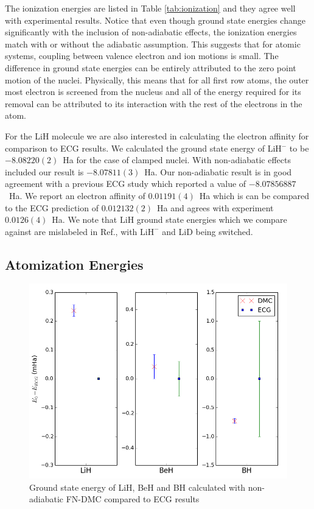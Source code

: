 \documentclass[pra,superscriptaddress,groupedaddress,twocolumn]{revtex4}
\begin{document}
The ionization energies are listed in Table \ref{tab:ionization} and they agree well with experimental results. Notice that even though ground state energies change significantly with the inclusion of non-adiabatic effects, the ionization energies match with or without the adiabatic assumption. This suggests that for atomic systems, coupling between valence electron and ion motions is small. The difference in ground state energies can be entirely attributed to the zero point motion of the nuclei. Physically, this means that for all first row atoms, the outer most electron is screened from the nucleus and all of the energy required for its removal can be attributed to its interaction with the rest of the electrons in the atom.

For the LiH molecule we are also interested in calculating the electron affinity for comparison to ECG results. We calculated the ground state energy of LiH$^-$ to be $-8.08220(2)$~Ha for the case of clamped nuclei.  With non-adiabatic effects included our result is  $-8.07811(3)$~Ha. Our non-adiabatic result is in good agreement with a previous ECG study \cite{Bubin_LiH_noBO} which reported a value of $-8.07856887$~Ha. We report an electron affinity of $0.01191(4)$~Ha which is can be compared to the ECG prediction of $0.012132(2)$~Ha and agrees with experiment $0.0126(4)$~Ha.  We note that $\text{LiH}$ ground state energies which we compare against are mislabeled in Ref.\cite{Bubin_LiH_noBO}, with $\text{LiH}^-$ and LiD being switched.


 
\subsection{Atomization Energies}

\begin{figure}
\includegraphics[scale=.4]{Figures/dia-ECG}
\caption{Ground state energy of LiH, BeH and BH calculated with non-adiabatic FN-DMC compared to ECG results}
\end{figure}
\end{document}
